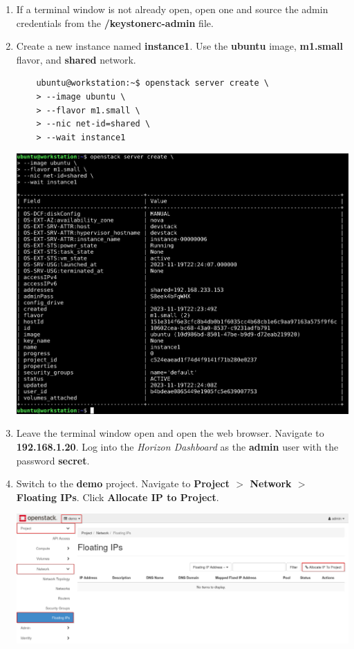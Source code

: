 \documentclass[letterpaper, 12pt]{article}
\begin{document}
\begin{enumerate}
    \item If a terminal window is not already open, open one and source the admin credentials from the 
    \textbf{\texttildemid/keystonerc-admin} file.

    \item Create a new instance named \textbf{instance1}. Use the \textbf{ubuntu} image, \textbf{m1.small} flavor, and
    \textbf{shared} network.
    \begin{lstlisting}
    ubuntu@workstation:~$ openstack server create \
    > --image ubuntu \
    > --flavor m1.small \
    > --nic net-id=shared \
    > --wait instance1
    \end{lstlisting}

    \begin{center}
        \includegraphics[width=\linewidth]{images/part3/step2.png}
    \end{center}

    \item Leave the terminal window open and open the web browser. Navigate to \textbf{192.168.1.20}. Log into the
    \textit{Horizon Dashboard} as the \textbf{admin} user with the password \textbf{secret}.


    \item Switch to the \textbf{demo} project. Navigate to \textbf{Project $>$ Network $>$ Floating IPs}. Click
    \textbf{Allocate IP to Project}.

    \begin{center}
        \includegraphics[width=\linewidth]{images/part3/step4.png}
    \end{center}


\end{enumerate}
\end{document}
